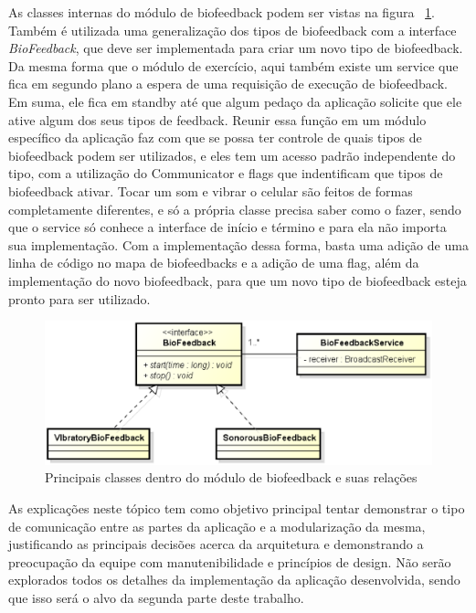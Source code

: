 As classes internas do módulo de biofeedback podem ser vistas na figura ~\ref{diagramaBioFeedback}. Também é utilizada uma generalização dos tipos de biofeedback com a interface \textit{BioFeedback}, que deve ser implementada para criar um novo tipo de biofeedback. Da mesma forma que o módulo de exercício, aqui também existe um service que fica em segundo plano a espera de uma requisição de execução de biofeedback. Em suma, ele fica em standby até que algum pedaço da aplicação solicite que ele ative algum dos seus tipos de feedback. Reunir essa função em um módulo específico da aplicação faz com que se possa ter controle de quais tipos de biofeedback podem ser utilizados, e eles tem um acesso padrão independente do tipo, com a utilização do Communicator e flags que indentificam que tipos de biofeedback ativar. Tocar um som e vibrar o celular são feitos de formas completamente diferentes, e só a própria classe precisa saber como o fazer, sendo que o service só conhece a interface de início e término e para ela não importa sua implementação. Com a implementação dessa forma, basta uma adição de uma linha de código no mapa de biofeedbacks e a adição de uma flag, além da implementação do novo biofeedback, para que um novo tipo de biofeedback esteja pronto para ser utilizado.

\begin{figure}[!htb]
\centering
\includegraphics [keepaspectratio=true,scale=0.60]{figuras/diagramaBioFeedback.eps}
\caption{Principais classes dentro do módulo de biofeedback e suas relações}
\label{diagramaBioFeedback}
\end{figure}
 
 As explicações neste tópico tem como objetivo principal tentar demonstrar o tipo de comunicação entre as partes da aplicação e a modularização  da mesma, justificando as principais decisões acerca da arquitetura e demonstrando a preocupação da equipe com manutenibilidade e princípios de design. Não serão explorados todos os detalhes da implementação da aplicação desenvolvida, sendo que isso será o alvo da segunda parte deste trabalho.